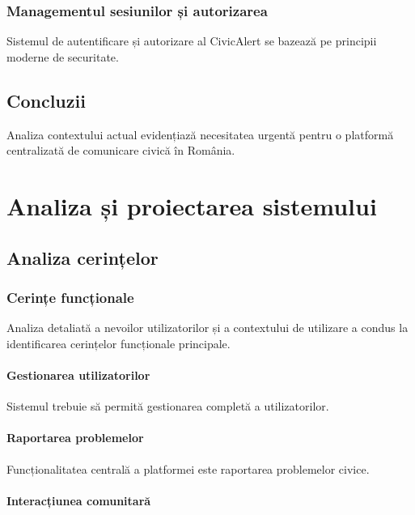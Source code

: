 \documentclass[12pt,a4paper]{report}
\begin{document}
\subsection{Managementul sesiunilor și autorizarea}

Sistemul de autentificare și autorizare al CivicAlert se bazează pe principii moderne de securitate.

\section{Concluzii}

Analiza contextului actual evidențiază necesitatea urgentă pentru o platformă centralizată de comunicare civică în România.

\newpage
\chapter{Analiza și proiectarea sistemului}

\section{Analiza cerințelor}

\subsection{Cerințe funcționale}

Analiza detaliată a nevoilor utilizatorilor și a contextului de utilizare a condus la identificarea cerințelor funcționale principale.

\subsubsection{Gestionarea utilizatorilor}

Sistemul trebuie să permită gestionarea completă a utilizatorilor.

\subsubsection{Raportarea problemelor}

Funcționalitatea centrală a platformei este raportarea problemelor civice.

\subsubsection{Interacțiunea comunitară}
\end{document}
